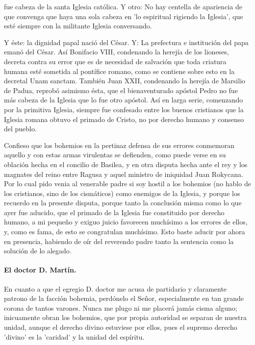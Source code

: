fue cabeza de la santa Iglesia católica. Y otro: No hay centella de apariencia de que convenga que haya una sola cabeza en 'lo espiritual rigiendo la Iglesia', que esté siempre con la militante Iglesia conversando.

Y éste: la dignidad papal nació del César. Y: La prefectura e institución del papa emanó del César. Así Bonifacio VIII, condenando la herejía de los lioneses, decreta contra su error que es de necesidad de salvación que toda criatura humana esté sometida al pontífice romano, como se contiene sobre esto en la decretal Unam sanctam. También Juan XXII, condenando la herejía de Marsilio de Padua, reprobó asimismo ésta, que el bienaventurado apóstol Pedro no fue más cabeza de la Iglesia que lo fue otro apóstol. Así en larga serie, comenzando por la primitiva Iglesia, siempre fue confesado entre los buenos cristianos que la Iglesia romana obtuvo el primado de Cristo, no por derecho humano y consenso del pueblo.

Confieso que los bohemios en la pertinaz defensa de sus errores conmemoran aquello y con estas armas virulentas se defienden, como puede verse en su oblación hecha en el concilio de Basilea, y en otra disputa hecha ante el rey y los magnates del reino entre Ragusa y aquel ministro de iniquidad Juan Rokycana. Por lo cual pido venia al venerable padre si soy hostil a los bohemios (no hablo de los cristianos, sino de los cismáticos) como enemigos de la Iglesia, y porque los recuerdo en la presente disputa, porque tanto la conclusión misma como lo que ayer fue aducido, que el primado de la Iglesia fue constituido por derecho humano, a mi pequeño y exiguo juicio favorecen muchísimo a los errores de ellos, y, como es fama, de esto se congratulan muchísimo. Esto baste aducir por ahora en presencia, habiendo de oír del reverendo padre tanto la sentencia como la solución de lo alegado.

\paragraph*{El doctor D. Martín.}

En cuanto a que el egregio D. doctor me acusa de partidario y claramente patrono de la facción bohemia, perdónelo el Señor, especialmente en tan grande corona de tantos varones. Nunca me plugo ni me placerá jamás cisma alguno; inicuamente obran los bohemios, que por propia autoridad se separan de nuestra unidad, aunque el derecho divino estuviese por ellos, pues el supremo \marginpar{\small[276]} derecho 'divino' es la 'caridad' y la unidad del espíritu.


